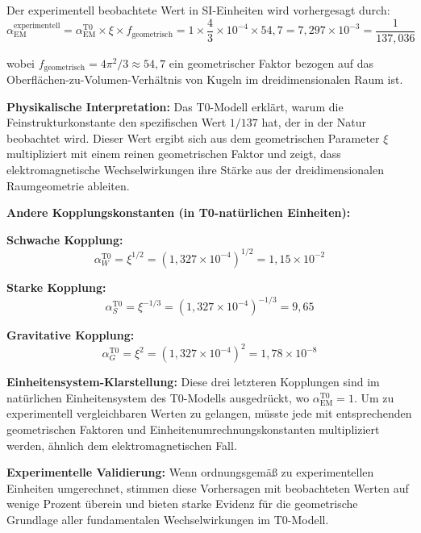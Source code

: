 \documentclass[12pt,a4paper]{article}
\newcommand{\xipar}{\xi}
\begin{document}
	Der experimentell beobachtete Wert in SI-Einheiten wird vorhergesagt durch:
	\begin{equation}
		\alpha_{\text{EM}}^{\text{experimentell}} = \alpha_{\text{EM}}^{\text{T0}} \times \xipar \times f_{\text{geometrisch}} = 1 \times \frac{4}{3} \times 10^{-4} \times 54{,}7 = 7{,}297 \times 10^{-3} = \frac{1}{137{,}036}
	\end{equation}
	
	wobei $f_{\text{geometrisch}} = 4\pi^2/3 \approx 54{,}7$ ein geometrischer Faktor bezogen auf das Oberflächen-zu-Volumen-Verhältnis von Kugeln im dreidimensionalen Raum ist.
	
	\textbf{Physikalische Interpretation:} Das T0-Modell erklärt, warum die Feinstrukturkonstante den spezifischen Wert $1/137$ hat, der in der Natur beobachtet wird. Dieser Wert ergibt sich aus dem geometrischen Parameter $\xipar$ multipliziert mit einem reinen geometrischen Faktor und zeigt, dass elektromagnetische Wechselwirkungen ihre Stärke aus der dreidimensionalen Raumgeometrie ableiten.
	
	\textbf{Andere Kopplungskonstanten (in T0-natürlichen Einheiten):}
	
	\textbf{Schwache Kopplung:}
	\begin{equation}
		\alpha_W^{\text{T0}} = \xipar^{1/2} = (1{,}327 \times 10^{-4})^{1/2} = 1{,}15 \times 10^{-2}
	\end{equation}
	
	\textbf{Starke Kopplung:}
	\begin{equation}
		\alpha_S^{\text{T0}} = \xipar^{-1/3} = (1{,}327 \times 10^{-4})^{-1/3} = 9{,}65
	\end{equation}
	
	\textbf{Gravitative Kopplung:}
	\begin{equation}
		\alpha_G^{\text{T0}} = \xipar^2 = (1{,}327 \times 10^{-4})^2 = 1{,}78 \times 10^{-8}
	\end{equation}
	
	\textbf{Einheitensystem-Klarstellung:} 
	Diese drei letzteren Kopplungen sind im natürlichen Einheitensystem des T0-Modells ausgedrückt, wo $\alpha_{\text{EM}}^{\text{T0}} = 1$. Um zu experimentell vergleichbaren Werten zu gelangen, müsste jede mit entsprechenden geometrischen Faktoren und Einheitenumrechnungskonstanten multipliziert werden, ähnlich dem elektromagnetischen Fall.
	
	\textbf{Experimentelle Validierung:} Wenn ordnungsgemäß zu experimentellen Einheiten umgerechnet, stimmen diese Vorhersagen mit beobachteten Werten auf wenige Prozent überein und bieten starke Evidenz für die geometrische Grundlage aller fundamentalen Wechselwirkungen im T0-Modell.
	
\end{document}
